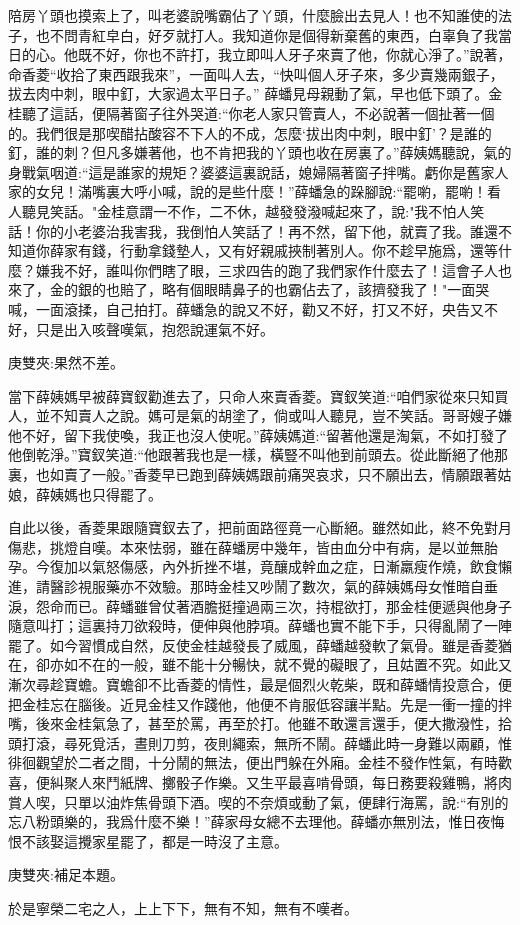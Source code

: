 \begin{parag}
陪房丫頭也摸索上了，叫老婆說嘴霸佔了丫頭，什麼臉出去見人！也不知誰使的法子，也不問青紅皁白，好歹就打人。我知道你是個得新棄舊的東西，白辜負了我當日的心。他既不好，你也不許打，我立即叫人牙子來賣了他，你就心淨了。”說著，命香菱“收拾了東西跟我來”，一面叫人去，“快叫個人牙子來，多少賣幾兩銀子，拔去肉中刺，眼中釘，大家過太平日子。” 薛蟠見母親動了氣，早也低下頭了。金桂聽了這話，便隔著窗子往外哭道:“你老人家只管賣人，不必說著一個扯著一個的。我們很是那喫醋拈酸容不下人的不成，怎麼‘拔出肉中刺，眼中釘’？是誰的釘，誰的刺？但凡多嫌著他，也不肯把我的丫頭也收在房裏了。”薛姨媽聽說，氣的身戰氣咽道:“這是誰家的規矩？婆婆這裏說話，媳婦隔著窗子拌嘴。虧你是舊家人家的女兒！滿嘴裏大呼小喊，說的是些什麼！”薛蟠急的跺腳說:“罷喲，罷喲！看人聽見笑話。"金桂意謂一不作，二不休，越發發潑喊起來了，說:"我不怕人笑話！你的小老婆治我害我，我倒怕人笑話了！再不然，留下他，就賣了我。誰還不知道你薛家有錢，行動拿錢墊人，又有好親戚挾制著別人。你不趁早施爲，還等什麼？嫌我不好，誰叫你們瞎了眼，三求四告的跑了我們家作什麼去了！這會子人也來了，金的銀的也賠了，略有個眼睛鼻子的也霸佔去了，該擠發我了！"一面哭喊，一面滾揉，自己拍打。薛蟠急的說又不好，勸又不好，打又不好，央告又不好，只是出入咳聲嘆氣，抱怨說運氣不好。\begin{note}庚雙夾:果然不差。\end{note}當下薛姨媽早被薛寶釵勸進去了，只命人來賣香菱。寶釵笑道:“咱們家從來只知買人，並不知賣人之說。媽可是氣的胡塗了，倘或叫人聽見，豈不笑話。哥哥嫂子嫌他不好，留下我使喚，我正也沒人使呢。”薛姨媽道:“留著他還是淘氣，不如打發了他倒乾淨。”寶釵笑道:“他跟著我也是一樣，橫豎不叫他到前頭去。從此斷絕了他那裏，也如賣了一般。”香菱早已跑到薛姨媽跟前痛哭哀求，只不願出去，情願跟著姑娘，薛姨媽也只得罷了。
\end{parag}


\begin{parag}
    自此以後，香菱果跟隨寶釵去了，把前面路徑竟一心斷絕。雖然如此，終不免對月傷悲，挑燈自嘆。本來怯弱，雖在薛蟠房中幾年，皆由血分中有病，是以並無胎孕。今復加以氣怒傷感，內外折挫不堪，竟釀成幹血之症，日漸羸瘦作燒，飲食懶進，請醫診視服藥亦不效驗。那時金桂又吵鬧了數次，氣的薛姨媽母女惟暗自垂淚，怨命而已。薛蟠雖曾仗著酒膽挺撞過兩三次，持棍欲打，那金桂便遞與他身子隨意叫打；這裏持刀欲殺時，便伸與他脖項。薛蟠也實不能下手，只得亂鬧了一陣罷了。如今習慣成自然，反使金桂越發長了威風，薛蟠越發軟了氣骨。雖是香菱猶在，卻亦如不在的一般，雖不能十分暢快，就不覺的礙眼了，且姑置不究。如此又漸次尋趁寶蟾。寶蟾卻不比香菱的情性，最是個烈火乾柴，既和薛蟠情投意合，便把金桂忘在腦後。近見金桂又作踐他，他便不肯服低容讓半點。先是一衝一撞的拌嘴，後來金桂氣急了，甚至於罵，再至於打。他雖不敢還言還手，便大撒潑性，拾頭打滾，尋死覓活，晝則刀剪，夜則繩索，無所不鬧。薛蟠此時一身難以兩顧，惟徘徊觀望於二者之間，十分鬧的無法，便出門躲在外廂。金桂不發作性氣，有時歡喜，便糾聚人來鬥紙牌、擲骰子作樂。又生平最喜啃骨頭，每日務要殺雞鴨，將肉賞人喫，只單以油炸焦骨頭下酒。喫的不奈煩或動了氣，便肆行海罵，說:“有別的忘八粉頭樂的，我爲什麼不樂！”薛家母女總不去理他。薛蟠亦無別法，惟日夜悔恨不該娶這攪家星罷了，都是一時沒了主意。\begin{note}庚雙夾:補足本題。\end{note}於是寧榮二宅之人，上上下下，無有不知，無有不嘆者。
\end{parag}


